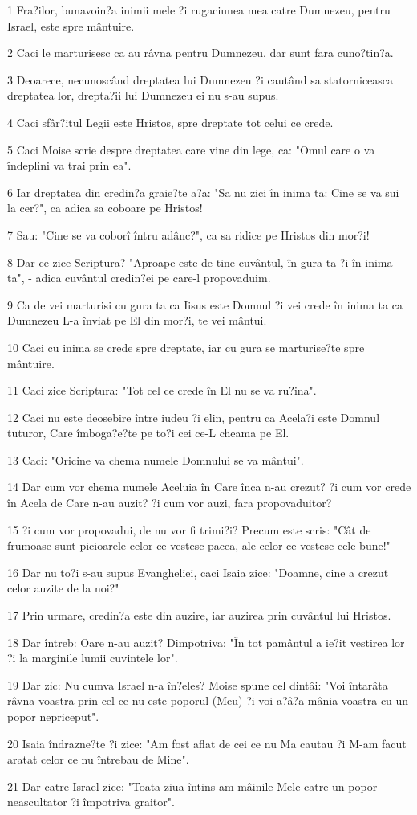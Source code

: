 \par 1 Fra?ilor, bunavoin?a inimii mele ?i rugaciunea mea catre Dumnezeu, pentru Israel, este spre mântuire.
\par 2 Caci le marturisesc ca au râvna pentru Dumnezeu, dar sunt fara cuno?tin?a.
\par 3 Deoarece, necunoscând dreptatea lui Dumnezeu ?i cautând sa statorniceasca dreptatea lor, drepta?ii lui Dumnezeu ei nu s-au supus.
\par 4 Caci sfâr?itul Legii este Hristos, spre dreptate tot celui ce crede.
\par 5 Caci Moise scrie despre dreptatea care vine din lege, ca: "Omul care o va îndeplini va trai prin ea".
\par 6 Iar dreptatea din credin?a graie?te a?a: "Sa nu zici în inima ta: Cine se va sui la cer?", ca adica sa coboare pe Hristos!
\par 7 Sau: "Cine se va coborî întru adânc?", ca sa ridice pe Hristos din mor?i!
\par 8 Dar ce zice Scriptura? "Aproape este de tine cuvântul, în gura ta ?i în inima ta", - adica cuvântul credin?ei pe care-l propovaduim.
\par 9 Ca de vei marturisi cu gura ta ca Iisus este Domnul ?i vei crede în inima ta ca Dumnezeu L-a înviat pe El din mor?i, te vei mântui.
\par 10 Caci cu inima se crede spre dreptate, iar cu gura se marturise?te spre mântuire.
\par 11 Caci zice Scriptura: "Tot cel ce crede în El nu se va ru?ina".
\par 12 Caci nu este deosebire între iudeu ?i elin, pentru ca Acela?i este Domnul tuturor, Care îmboga?e?te pe to?i cei ce-L cheama pe El.
\par 13 Caci: "Oricine va chema numele Domnului se va mântui".
\par 14 Dar cum vor chema numele Aceluia în Care înca n-au crezut? ?i cum vor crede în Acela de Care n-au auzit? ?i cum vor auzi, fara propovaduitor?
\par 15 ?i cum vor propovadui, de nu vor fi trimi?i? Precum este scris: "Cât de frumoase sunt picioarele celor ce vestesc pacea, ale celor ce vestesc cele bune!"
\par 16 Dar nu to?i s-au supus Evangheliei, caci Isaia zice: "Doamne, cine a crezut celor auzite de la noi?"
\par 17 Prin urmare, credin?a este din auzire, iar auzirea prin cuvântul lui Hristos.
\par 18 Dar întreb: Oare n-au auzit? Dimpotriva: "În tot pamântul a ie?it vestirea lor ?i la marginile lumii cuvintele lor".
\par 19 Dar zic: Nu cumva Israel n-a în?eles? Moise spune cel dintâi: "Voi întarâta râvna voastra prin cel ce nu este poporul (Meu) ?i voi a?â?a mânia voastra cu un popor nepriceput".
\par 20 Isaia îndrazne?te ?i zice: "Am fost aflat de cei ce nu Ma cautau ?i M-am facut aratat celor ce nu întrebau de Mine".
\par 21 Dar catre Israel zice: "Toata ziua întins-am mâinile Mele catre un popor neascultator ?i împotriva graitor".


